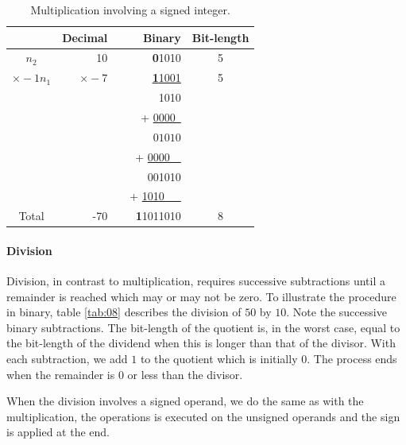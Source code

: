 \documentclass[12pt]{article}
\begin{document}
\begin{table}[ht]
    \centering
    \caption{Multiplication involving a signed integer.}
    \begin{tabular}{crrrc}
    \hline
    	  & Decimal & & Binary & Bit-length \\
    \hline      
    $n_2$ & 10	& & \textbf{0}1010 & 5 \\
    $\times -1n_1$ & \underline{$\times -7$} & & \underline{\textbf{1}1001} & 5
\\
    & & & 1010  & \\
    & & & + \underline{0000\ } & \\
    & & & $\,01010$ & \\
    & & & + \underline{0000\ \ } & \\
    & & & 001010 & \\
    & & & + \underline{1010\ \ \ } & \\
    Total& -70 & & \textbf{1}1011010 & 8\\
    \hline
	\end{tabular}
    \label{tab:07}
\end{table}

\paragraph{Division}
Division, in contrast to multiplication, requires successive subtractions until
a remainder is reached which may or may not be zero. To illustrate the
procedure in binary, table \ref{tab:08} describes the division of $50$ by $10$.
Note the successive binary subtractions. The bit-length of the quotient is, in
the worst case, equal to the bit-length of the dividend when this is longer
than that of the divisor. With each subtraction, we add $1$ to the quotient
which is initially $0$. The process ends when the remainder is $0$ or less than
the divisor.

When the division involves a signed operand, we do the same as with the
multiplication, the operations is executed on the unsigned operands and the
sign is applied at the end.
\end{document}
